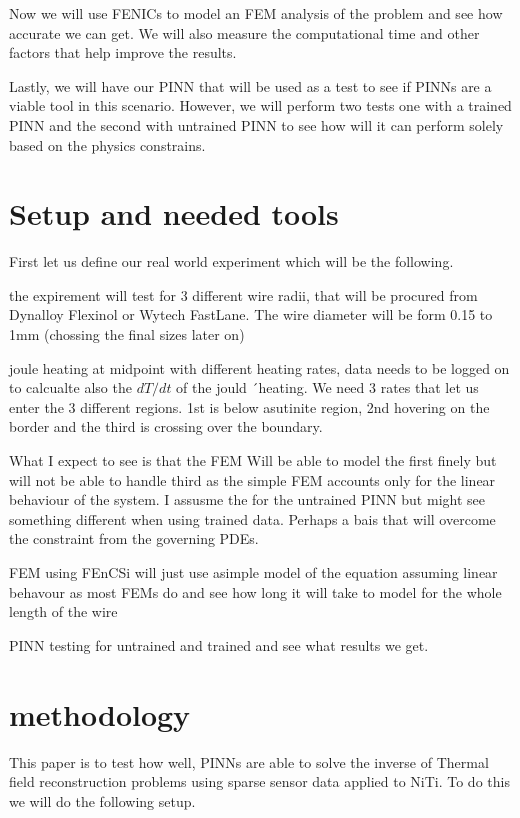 \documentclass[12pt, a4paper]{article}
\begin{document}
Now we will use FENICs to model an FEM analysis of the problem and see how accurate we can get. 
We will also measure the computational time and other factors that help improve the results. 

Lastly, we will have our PINN that will be used as a test to see if PINNs are a viable
tool in this scenario. However, we will perform two tests one with a trained PINN and the second with untrained PINN to see how will it can perform solely based on the physics constrains.

\section{Setup and needed tools}   

First let us define our real world experiment which will be the following. 

the expirement will test for 3 different wire radii, that will be procured from Dynalloy Flexinol or Wytech FastLane. The wire diameter will be form 0.15 to 1mm (chossing the final sizes later on)

joule heating at midpoint with different heating rates, data needs to be logged on to calcualte also the $dT/dt$ of the jould ´heating. We need 3 rates that let us enter the 3 different regions. 1st is below asutinite region, 2nd hovering on the border and the third is crossing over the boundary. 

What I expect to see is that the FEM Will be able to model the first finely but will not be able to handle third as the simple FEM accounts only for the linear behaviour of the system. I assusme the for the untrained PINN but might see something different when using trained data. Perhaps a bais that will overcome the constraint from the governing PDEs. 

FEM using FEnCSi will just use  asimple model of the equation assuming linear behavour as most FEMs do and see how long it will take to model for the whole length of the wire

PINN testing for untrained and trained and see what results we get. 



\section{methodology}
This paper is to test how well, PINNs are able to solve the inverse of Thermal field reconstruction problems using sparse sensor data applied to NiTi. To do this we will do the following setup. 
\end{document}
